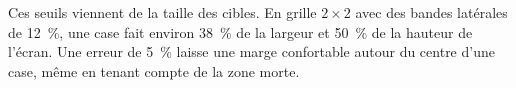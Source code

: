 Ces seuils viennent de la taille des cibles. En grille $2\times2$ avec des bandes latérales de \qty{12}{\percent}, une case fait environ \qty{38}{\percent} de la largeur et \qty{50}{\percent} de la hauteur de l'écran. Une erreur de \qty{5}{\percent} laisse une marge confortable autour du centre d'une case, même en tenant compte de la zone morte.
